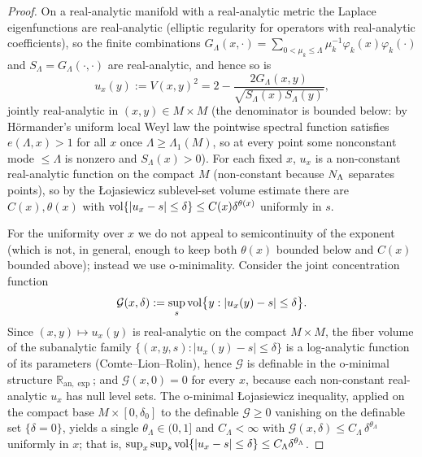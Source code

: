 \begin{proof}
On a real-analytic manifold with a real-analytic metric the Laplace eigenfunctions are
real-analytic (elliptic regularity for operators with real-analytic coefficients), so the
finite combinations $G_\Lambda(x,\cdot)=\sum_{0<\mu_k\le\Lambda}\mu_k^{-1}\varphi_k(x)\varphi_k(\cdot)$
and $S_\Lambda=G_\Lambda(\cdot,\cdot)$ are real-analytic, and hence so is
\[
u_x(y):=V(x,y)^2=2-\frac{2G_\Lambda(x,y)}{\sqrt{S_\Lambda(x)S_\Lambda(y)}} ,
\]
jointly real-analytic in $(x,y)\in M\times M$ (the denominator is bounded below: by
H\"ormander's uniform local Weyl law the pointwise spectral function satisfies $e(\Lambda,x)>1$
for all $x$ once $\Lambda\ge\Lambda_1(M)$, so at every point some nonconstant mode $\le\Lambda$
is nonzero and $S_\Lambda(x)>0$). For each fixed $x$, $u_x$ is a
non-constant real-analytic function on the compact $M$ (non-constant because $N_\Lambda$
separates points), so by the \L ojasiewicz sublevel-set volume estimate there are
$C(x),\theta(x)$ with $\operatorname{vol}\{\lvert u_x-s\rvert\le\delta\}\le C(x)\delta^{\theta(x)}$
uniformly in $s$.

For the uniformity over $x$ we do not appeal to semicontinuity of the exponent (which is
not, in general, enough to keep both $\theta(x)$ bounded below and $C(x)$ bounded above);
instead we use o-minimality. Consider the joint concentration function
\[
\mathcal G(x,\delta):=\sup_s\operatorname{vol}\bigl\{y:\lvert u_x(y)-s\rvert\le\delta\bigr\}.
\]
Since $(x,y)\mapsto u_x(y)$ is real-analytic on the compact $M\times M$, the fiber volume
of the subanalytic family $\{(x,y,s):\lvert u_x(y)-s\rvert\le\delta\}$ is a log-analytic
function of its parameters (Comte--Lion--Rolin), hence $\mathcal G$ is definable in the
o-minimal structure $\mathbb R_{\mathrm{an},\exp}$; and $\mathcal G(x,0)=0$ for every $x$,
because each non-constant real-analytic $u_x$ has null level sets. The o-minimal
\L ojasiewicz inequality, applied on the compact base $M\times[0,\delta_0]$ to the
definable $\mathcal G\ge0$ vanishing on the definable set $\{\delta=0\}$, yields a single
$\theta_\Lambda\in(0,1]$ and $C_\Lambda<\infty$ with
$\mathcal G(x,\delta)\le C_\Lambda\,\delta^{\theta_\Lambda}$ uniformly in $x$; that is,
$\sup_x\sup_s\operatorname{vol}\{\lvert u_x-s\rvert\le\delta\}\le C_\Lambda\delta^{\theta_\Lambda}$.


\end{proof}
